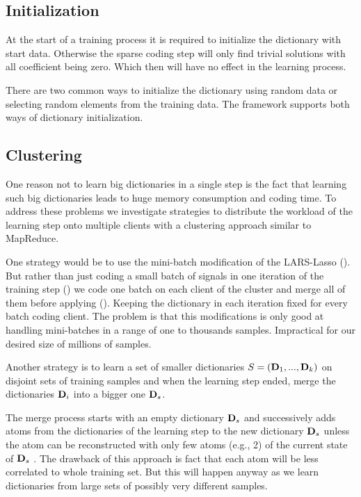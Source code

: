 \subsection{Initialization}
At the start of a training process it is required to initialize the
dictionary with start data. Otherwise the sparse coding step will only find
trivial solutions with all coefficient being zero. Which then will have no
effect in the learning process.

There are two common ways to initialize the dictionary using random data or
selecting random elements from the training data. The framework supports 
both ways of dictionary initialization. 


\subsection{Clustering}
\label{sec:clustering}
One reason not to learn big dictionaries in a single step is the fact that
learning such big dictionaries leads to huge memory consumption and coding time.
To address these problems we investigate strategies to distribute the workload
of the learning step onto multiple clients with a clustering approach similar to
MapReduce. 

One strategy would be to use the mini-batch
modification of the LARS-Lasso (). But rather
than just coding a small batch of signals in one iteration of the training
step () we code one batch on each client of the cluster
and merge all of them before applying (). Keeping the
dictionary in each iteration fixed for every batch coding client. The problem is
that this modifications is only good at handling mini-batches in a range of one
to thousands samples. Impractical for our desired size of millions of samples.

Another strategy is to learn a set of smaller dictionaries $S =
(\boldsymbol{\mathrm{D}}_1, ..., \boldsymbol{\mathrm{D}}_k)$ on disjoint sets of training samples and when
the learning step ended, merge the dictionaries $\boldsymbol{\mathrm{D}}_i$ into a bigger one
$\boldsymbol{\mathrm{D}}_{s}$. 

The merge process starts with an empty dictionary $\boldsymbol{\mathrm{D}}_{s}$  and
successively adds atoms from the dictionaries of the learning step to the new
dictionary $\boldsymbol{\mathrm{D}}_{s}$  unless the atom can be reconstructed with only few
atoms (e.g., 2) of the current state of $\boldsymbol{\mathrm{D}}_{s}$ . The drawback of this
approach is fact that  each atom will be less correlated to whole training set.
But this will happen anyway as we learn dictionaries from large sets of possibly
very different samples. 

